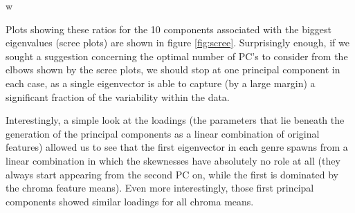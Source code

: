 w\documentclass[11pt, oneside]{article}
\begin{document}
Plots showing these ratios for the 10 components associated with the biggest eigenvalues (scree plots) are shown in figure \ref{fig:scree}. Surprisingly enough, if we sought a suggestion concerning the optimal number of PC's to consider from the elbows shown by the scree plots, we should stop at one principal component in each case, as a single eigenvector is able to capture (by a large margin) a significant fraction of the variability within the data.

Interestingly, a simple look at the loadings (the parameters that lie beneath the generation of the principal components as a linear combination of original features) allowed us to see that the first eigenvector in each genre spawns from a linear combination in which the skewnesses have absolutely no role at all (they always start appearing from the second PC on, while the first is dominated by the chroma feature means). Even more interestingly, those first principal components showed similar loadings for all chroma means.
\end{document}
